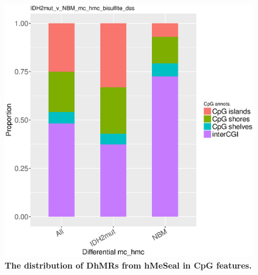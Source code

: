 \newpage

\begin{figure}[ht!]
\centering
\includegraphics[width=1\textwidth]{chap5figs/figure5_3.eps}
\caption[The distribution of DhMRs from hMeSeal in CpG features.]
{
\textbf{The distribution of DhMRs from hMeSeal in CpG features.}
}
\label{chap5:fig:3}
\end{figure}

\newpage

